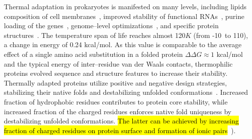 \documentclass[10pt,letterpaper]{article}
\begin{document}
Thermal adaptation in prokaryotes is manifested on many levels, including lipids composition of cell membranes~\cite{Chugunov2014Liquid}, improved stability of functional RNAs~\cite{Galtier1997Relationships}, purine loading of the genes~\cite{Lambros2003Optimum},  genome--level optimizations~\cite{Sabath2013Growth,Saha2015Overlapping},  and specific protein structures~\cite{Szilagyi2000Structural,England2003Natural}. The temperature span of life reaches almost 120$K$ (from -10\textcelsius\ to 110\textcelsius), a change in energy of 0.24 kcal/mol. As this value is comparable to the average effect of a single amino acid substitution in a folded protein $\Delta\Delta G\approx 1$ kcal/mol~\cite{Zeldovich2007Proteinb} and the typical energy of inter--residue van der Waals contacts, thermophilic proteins evolved sequence and structure features to increase their stability. Thermally adapted proteins utilize positive and negative design strategies, stabilizing their native folds and destabilizing unfolded conformations~\cite{Berezovsky2007Positive}. Increased fraction of hydrophobic residues contributes to protein core stability, while increased fraction of the charged residues enforces native fold uniqueness by destabilizing unfolded conformations. \hl{The latter can be achieved by increasing fraction of charged residues on protein surface and formation of ionic pairs}~\cite{Szilagyi2000Structural,Zhao2011Charged}).
\end{document}
